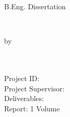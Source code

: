 
\begin{titlepage}

\begin{addmargin}[-1cm]{-3cm}

\begin{center}
\large

\hfill

\vfill

B.Eng. Dissertation \\ \bigskip \bigskip

\begingroup
\color{Maroon}\spacedallcaps{\myTitle} \\ \bigskip %
\endgroup

by \\
\spacedlowsmallcaps{\myName}
\\ %
\bigskip
\myUni\\
\myYear
\bigskip
\vfill


{\raggedright Project ID: \myProjId\\
Project Supervisor: \mySupervisor\\
Deliverables: \\
Report: 1 Volume \\
}


\vfill

\end{center}
\end{addmargin}

\end{titlepage}
